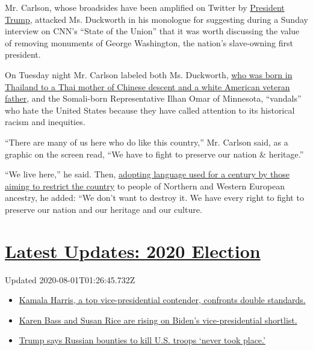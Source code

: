 Mr. Carlson, whose broadsides have been amplified on Twitter by
\href{https://www.nytimes.com/interactive/2020/us/elections/donald-trump.html}{President
Trump}, attacked Ms. Duckworth in his monologue for suggesting during a
Sunday interview on CNN's ``State of the Union'' that it was worth
discussing the value of removing monuments of George Washington, the
nation's slave-owning first president.

On Tuesday night Mr. Carlson labeled both Ms. Duckworth,
\href{https://www.nytimes.com/2020/06/25/us/politics/tammy-duckworth-vice-president-joe-biden.html}{who
was born in Thailand to a Thai mother of Chinese descent and a white
American veteran father}, and the Somali-born Representative Ilhan Omar
of Minnesota, ``vandals'' who hate the United States because they have
called attention to its historical racism and inequities.

``There are many of us here who do like this country,'' Mr. Carlson
said, as a graphic on the screen read, ``We have to fight to preserve
our nation \& heritage.''

``We live here,'' he said. Then,
\href{https://www.nytimes.com/2020/04/10/sunday-review/coronavirus-asian-racism.html}{adopting
language used for a century by those aiming to restrict the country} to
people of Northern and Western European ancestry, he added: ``We don't
want to destroy it. We have every right to fight to preserve our nation
and our heritage and our culture.

\hypertarget{latest-updates-2020-election}{%
\section{\texorpdfstring{\href{https://www.nytimes.com/2020/07/31/us/elections/biden-vs-trump.html?action=click\&pgtype=Article\&state=default\&region=MAIN_CONTENT_1\&context=storylines_live_updates}{Latest
Updates: 2020
Election}}{Latest Updates: 2020 Election}}\label{latest-updates-2020-election}}

Updated 2020-08-01T01:26:45.732Z

\begin{itemize}
\tightlist
\item
  \href{https://www.nytimes.com/2020/07/31/us/elections/biden-vs-trump.html?action=click\&pgtype=Article\&state=default\&region=MAIN_CONTENT_1\&context=storylines_live_updates\#link-29fdff45}{Kamala
  Harris, a top vice-presidential contender, confronts double
  standards.}
\item
  \href{https://www.nytimes.com/2020/07/31/us/elections/biden-vs-trump.html?action=click\&pgtype=Article\&state=default\&region=MAIN_CONTENT_1\&context=storylines_live_updates\#link-13ec3d9c}{Karen
  Bass and Susan Rice are rising on Biden's vice-presidential
  shortlist.}
\item
  \href{https://www.nytimes.com/2020/07/31/us/elections/biden-vs-trump.html?action=click\&pgtype=Article\&state=default\&region=MAIN_CONTENT_1\&context=storylines_live_updates\#link-49e9a016}{Trump
  says Russian bounties to kill U.S. troops `never took place.'}
\end{itemize}

